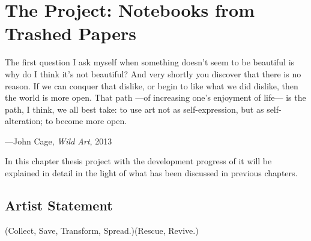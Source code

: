 \chapter{The Project: Notebooks from Trashed Papers}






\epigraph{The first question I ask myself when something doesn't seem to be beautiful is why do I think it's not beautiful? And very shortly you discover that there is no reason. If we can conquer that dislike, or begin to like what we did dislike, then the world is more open. That path ---of increasing one's enjoyment of life--- is the path, I think, we all best take: to use art not as self-expression, but as self-alteration; to become more open.}{\hfill---John Cage, \textit{Wild Art}, 2013}





In this chapter thesis project with the development progress of it will be explained in detail in the light of what has been discussed in previous chapters.








\section{Artist Statement}
(Collect, Save, Transform, Spread.)(Rescue, Revive.)

